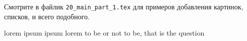 {
\pagestyle{framedcontent}
Смотрите в файлик \texttt{20\_main\_part\_1.tex} для примеров добавления картинок,
списков, и всего подобного.




%

lorem ipsum
ipsum lorem
to be or not to be, that is the question

\newpage
}